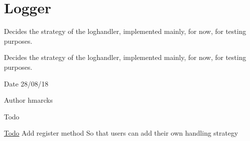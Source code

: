 \hypertarget{group__logger}{}\section{Logger}
\label{group__logger}


Decides the strategy of the loghandler, implemented mainly, for now, for testing purposes.  


Decides the strategy of the loghandler, implemented mainly, for now, for testing purposes. 

\begin{DoxyDate}{Date}
28/08/18
\end{DoxyDate}
\begin{DoxyAuthor}{Author}
hmarcks
\end{DoxyAuthor}
\begin{DoxyRefDesc}{Todo}
\item[\mbox{\hyperlink{todo__todo000011}{Todo}}]Add register method So that users can add their own handling strategy \end{DoxyRefDesc}
